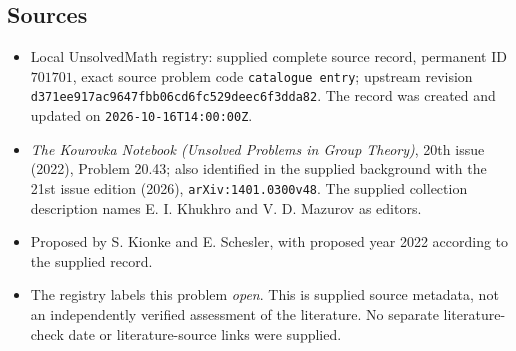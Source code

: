 \documentclass[11pt]{article}
\begin{document}
\subsection{Sources}
\begin{itemize}
\item Local UnsolvedMath registry: supplied complete source record, permanent ID \(701701\), exact source problem code \texttt{catalogue entry}; upstream revision \texttt{d371ee917ac9647fbb06cd6fc529deec6f3dda82}. The record was created and updated on \texttt{2026-10-16T14:00:00Z}.
\item \emph{The Kourovka Notebook (Unsolved Problems in Group Theory)}, 20th issue (2022), Problem 20.43; also identified in the supplied background with the 21st issue edition (2026), \texttt{arXiv:1401.0300v48}. The supplied collection description names E. I. Khukhro and V. D. Mazurov as editors.
\item Proposed by S. Kionke and E. Schesler, with proposed year 2022 according to the supplied record.
\item The registry labels this problem \emph{open}. This is supplied source metadata, not an independently verified assessment of the literature. No separate literature-check date or literature-source links were supplied.
\end{itemize}
\end{document}
